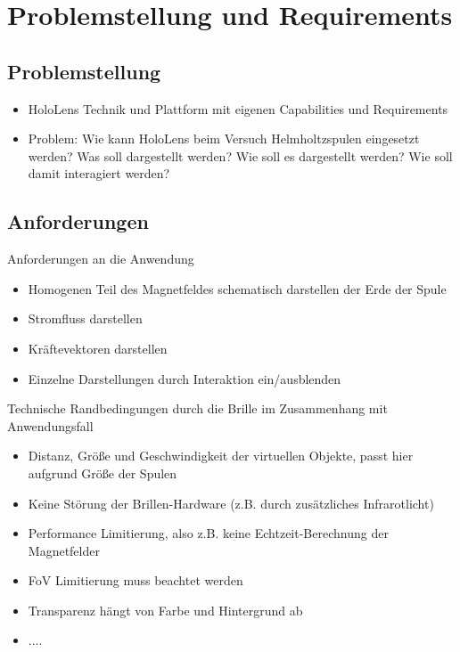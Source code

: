\section{Problemstellung und Requirements}
\label{sec-3}

\subsection{Problemstellung}
\label{sec-3-1}
\begin{itemize}
	\item HoloLens Technik und Plattform mit eigenen Capabilities und Requirements
	\item Problem: Wie kann HoloLens beim Versuch Helmholtzspulen eingesetzt werden?
	\subitem Was soll dargestellt werden?
	\subitem Wie soll es dargestellt werden?
	\subitem Wie soll damit interagiert werden?
\end{itemize}

\subsection{Anforderungen}
\label{sec-3-2}
Anforderungen an die Anwendung
\begin{itemize}
	\item Homogenen Teil des Magnetfeldes schematisch darstellen
	\subitem der Erde
	\subitem der Spule
	\item Stromfluss darstellen
	\item Kräftevektoren darstellen
	\item Einzelne Darstellungen durch Interaktion ein/ausblenden
\end{itemize}

Technische Randbedingungen durch die Brille im Zusammenhang mit Anwendungsfall
\begin{itemize}
	\item Distanz, Größe und Geschwindigkeit der virtuellen Objekte, passt hier aufgrund Größe der Spulen
	\item Keine Störung der Brillen-Hardware (z.B. durch zusätzliches Infrarotlicht)
	\item Performance Limitierung, also z.B. keine Echtzeit-Berechnung der Magnetfelder
	\item FoV Limitierung muss beachtet werden
	\item Transparenz hängt von Farbe und Hintergrund ab
	\item ....
\end{itemize}

